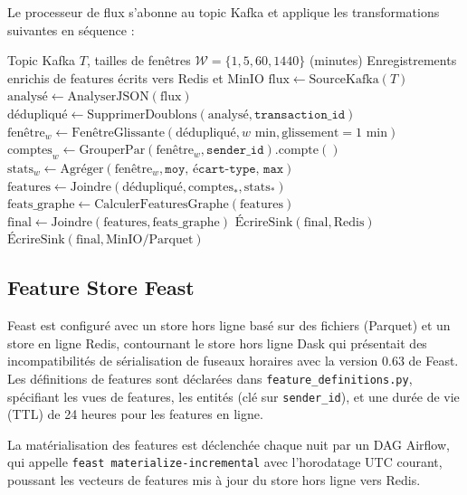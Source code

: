 \documentclass[12pt,a4paper,oneside]{book}
\theoremstyle{definition}
\theoremstyle{plain}
\begin{document}
Le processeur de flux s'abonne au topic Kafka et applique les transformations suivantes en séquence :

\begin{algorithm}[H]
\caption{Calcul de Features en Flux}
\label{alg:stream}
\begin{algorithmic}[1]
\Require Topic Kafka $T$, tailles de fenêtres $\mathcal{W} = \{1, 5, 60, 1440\}$ (minutes)
\Ensure Enregistrements enrichis de features écrits vers Redis et MinIO
\State $\text{flux} \leftarrow \text{SourceKafka}(T)$
\State $\text{analysé} \leftarrow \text{AnalyserJSON}(\text{flux})$
\State $\text{dédupliqué} \leftarrow \text{SupprimerDoublons}(\text{analysé}, \texttt{transaction\_id})$
  \State $\text{fenêtre}_w \leftarrow \text{FenêtreGlissante}(\text{dédupliqué}, w\text{ min}, \text{glissement}=1\text{ min})$
  \State $\text{comptes}_w \leftarrow \text{GrouperPar}(\text{fenêtre}_w, \texttt{sender\_id}).\text{compte}()$
  \State $\text{stats}_w \leftarrow \text{Agréger}(\text{fenêtre}_w, \texttt{moy, écart-type, max})$
\EndFor
\State $\text{features} \leftarrow \text{Joindre}(\text{dédupliqué}, \text{comptes}_*, \text{stats}_*)$
\State $\text{feats\_graphe} \leftarrow \text{CalculerFeaturesGraphe}(\text{features})$
\State $\text{final} \leftarrow \text{Joindre}(\text{features}, \text{feats\_graphe})$
\State $\text{ÉcrireSink}(\text{final}, \text{Redis})$
\State $\text{ÉcrireSink}(\text{final}, \text{MinIO/Parquet})$
\end{algorithmic}
\end{algorithm}

\subsection{Feature Store Feast}

Feast est configuré avec un store hors ligne basé sur des fichiers (Parquet) et un store en ligne Redis, contournant le store hors ligne Dask qui présentait des incompatibilités de sérialisation de fuseaux horaires avec la version 0.63 de Feast. Les définitions de features sont déclarées dans \texttt{feature\_definitions.py}, spécifiant les vues de features, les entités (clé sur \texttt{sender\_id}), et une durée de vie (TTL) de 24 heures pour les features en ligne.

La matérialisation des features est déclenchée chaque nuit par un DAG Airflow, qui appelle \texttt{feast materialize-incremental} avec l'horodatage UTC courant, poussant les vecteurs de features mis à jour du store hors ligne vers Redis.
\end{document}
